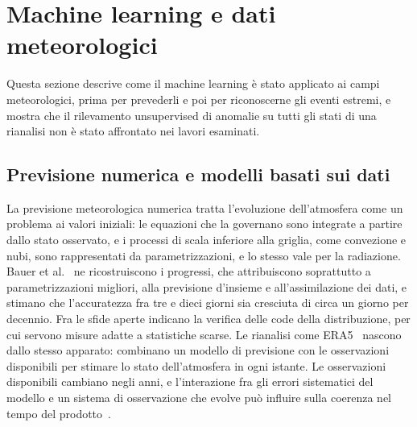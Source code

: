 \section{Machine learning e dati meteorologici}
\label{sec:rw-meteo}

Questa sezione descrive come il machine learning è stato applicato ai campi meteorologici, prima per prevederli e poi per riconoscerne gli eventi estremi, e mostra che il rilevamento unsupervised di anomalie su tutti gli stati di una rianalisi non è stato affrontato nei lavori esaminati.

\subsection{Previsione numerica e modelli basati sui dati}
\label{sec:rw-nwp}

La previsione meteorologica numerica tratta l'evoluzione dell'atmosfera come un problema ai valori iniziali: le equazioni che la governano sono integrate a partire dallo stato osservato, e i processi di scala inferiore alla griglia, come convezione e nubi, sono rappresentati da parametrizzazioni, e lo stesso vale per la radiazione. Bauer et al.~\cite{bauer2015quiet} ne ricostruiscono i progressi, che attribuiscono soprattutto a parametrizzazioni migliori, alla previsione d'insieme e all'assimilazione dei dati, e stimano che l'accuratezza fra tre e dieci giorni sia cresciuta di circa un giorno per decennio. Fra le sfide aperte indicano la verifica delle code della distribuzione, per cui servono misure adatte a statistiche scarse. Le rianalisi come ERA5~\cite{hersbach2020era5} nascono dallo stesso apparato: combinano un modello di previsione con le osservazioni disponibili per stimare lo stato dell'atmosfera in ogni istante. Le osservazioni disponibili cambiano negli anni, e l'interazione fra gli errori sistematici del modello e un sistema di osservazione che evolve può influire sulla coerenza nel tempo del prodotto~\cite{hersbach2020era5}.

